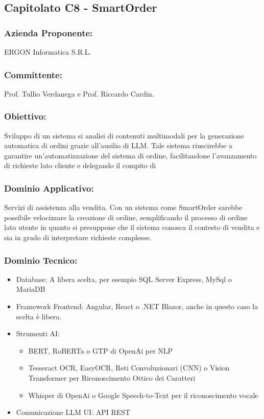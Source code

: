\documentclass[a4paper,12pt]{article}
\begin{document}
\vspace{2.0cm}

\subsection{ Capitolato C8 - SmartOrder}
\subsubsection*{Azienda Proponente:} ERGON Informatica S.R.L.
\subsubsection*{Committente:} Prof. Tullio Verdanega e Prof. Riccardo Cardin.
\subsubsection*{Obiettivo:} Sviluppo di un sistema si analisi di contenuti multimodali per la generazione automatica di ordini grazie all'ausilio di LLM. Tale sistema riuscirebbe a garantire un'automatizzazione del sistema di ordine, facilitandone l'avanzamento di richieste lato cliente e delegando il compito di 
\subsubsection*{Dominio Applicativo:} Servizi di assistenza alla vendita. Con un sistema come SmartOrder sarebbe possibile velocizzare la creazione di ordine, semplificando il processo di ordine lato utente in quanto si presuppone che il sistema conosca il contesto di vendita e sia in grado di interpretare richieste complesse.
\subsubsection*{Dominio Tecnico:}
\begin{itemize}
    \item Database: A libera scelta, per esempio SQL Server Express, MySql o MariaDB
    \item Framework Frontend: Angular, React o .NET Blazor, anche in questo caso la scelta è libera.
    \item Strumenti AI: \begin{itemize}
                            \item BERT, RoBERTa o GTP di OpenAi per NLP
                            \item Tesseract OCR, EasyOCR, Reti Convoluzionari (CNN) o Vision Transformer per Riconoscimento Ottico dei Caratteri
                            \item Whisper di OpenAi o Google Speech-to-Text per il riconoscimento vocale
                        \end{itemize}
    \item Comunicazione LLM UI: API REST
\end{itemize}
\end{document}
